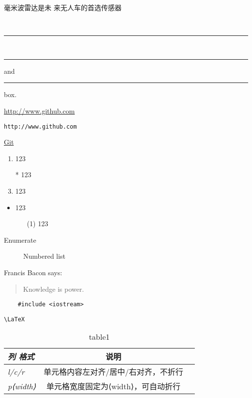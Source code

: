 \documentclass{zxhClass}
\begin{document}
{ 毫米波雷达是未 来无人车的首选传感器}

\\
\rule{4pt}{4pt}\\
\rule[4pt]{6pt}{8pt} and
\rule[-4pt]{6pt}{8pt} box.



\url{http://www.github.com}\par
\nolinkurl{http://www.github.com} \par
\href{http://www.baidu.com}{Git}

		\begin{enumerate}
			\item 123
			\item[*] 123
			\item 123
		\end{enumerate}
	
		\begin{itemize}
			\item 123
			\begin{itemize}
				\item[(1)] 123
			\end{itemize}
		\end{itemize}
	\begin{description}
		\item[Enumerate] Numbered list
	\end{description}

Francis Bacon says:
\begin{quotation}
	Knowledge is power.
\end{quotation}
\begin{verbatim}
	#include <iostream>
\end{verbatim}
\verb|\LaTeX|

\begin{table}[htbp]
	\begin{tabular}{>{\itshape}l<{}|cc}
		\hline 
		列 格式      &    说明&\\
		\hline
		l/c/r       &   单元格内容左对齐/居中/右对齐，不折行&\\
		\cline{2-3}
		p{⟨width⟩}  &   单元格宽度固定为⟨width⟩，可自动折行&\\
		\hline
	\end{tabular}
	\caption{table1}\label{表格1}
\end{table}
\end{document}
